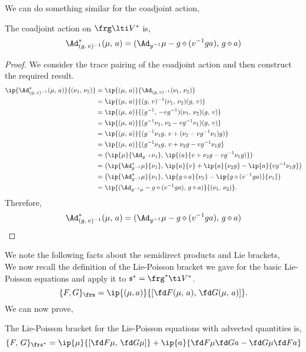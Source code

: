 \noindent
We can do something similar for the coadjoint action,
\begin{nprop}
   The coadjoint action on $\frg \lti V^*$ is,
   $$ \Ad^*_{(g,\, v)^{-1}} (\mu,\, a) = (\Ad_{g^{-1}}\mu - g \diamond (v^{-1}ga) ,\, g\diamond a) $$
\end{nprop}
\begin{proof}
  We consider the trace pairing of the coadjoint action and then construct the required result.
  \begin{align*}
    \ip{\Ad^*_{(g,\, v)^{-1}} (\mu,\, a)}{(\nu_1,\, \nu_2)} &= \ip{(\mu,\, a)}{\Ad_{(g,\,v)^{-1}} (\nu_1,\, \nu_2)} \\
    &= \ip{(\mu,\, a)}{(g,\,v)^{-1}(\nu_1,\, \nu_2)(g,\,v)} \\
    &= \ip{(\mu,\, a)}{ (g^{-1},\, -vg^{-1})(\nu_1,\, \nu_2)(g,\,v) } \\
    &= \ip{(\mu,\, a)}{(g^{-1}\nu_1,\, \nu_2 - vg^{-1}\nu_1)(g,\, v)} \\
    &= \ip{(\mu,\, a)}{(g^{-1}\nu_1 g,\,v + (\nu_2 - vg^{-1}\nu_1)g)} \\
    &= \ip{(\mu,\, a)}{(g^{-1}\nu_1 g,\,v + \nu_2g - vg^{-1}\nu_1g} \\
    &= \left(\ip{\mu}{\Ad_{g^{-1}}\nu_1},\, \ip{(a}{v + \nu_2g - vg^{-1}\nu_1g )}\right) \\
    &= \left( \ip{\Ad_{g^{-1}}^*\mu}{ \nu_1} ,\, \ip{a}{v} + \ip{a}{\nu_2g} - \ip{a}{vg^{-1}\nu_1g}\right) \\
    &= \left( \ip{\Ad_{g^{-1}}^*\mu}{ \nu_1} ,\, \ip{g \diamond a}{\nu_2} - \ip{g \diamond (v^{-1}ga)}{\nu_1}\right) \\
    &= \ip{(\Ad_{g^{-1}\mu} -g \diamond (v^{-1}ga),\, g \diamond a)}{(\nu_1,\, \nu_2)}.
  \end{align*}
  Therefore,
  $$ \Ad^*_{(g,\, v)^{-1}} (\mu,\, a) = (\Ad_{g^{-1}}\mu - g \diamond (v^{-1}ga) ,\, g\diamond a) $$
\end{proof}
\noindent
We note the following facts about the semidirect products and Lie brackets,
$$  $$
\noindent
We now recall the definition of the Lie-Poisson bracket we gave for the basic Lie-Poisson equations and apply it to $\mathfrak{s}^* = \frg^* \ti V^*$.
\begin{equation}
  \{F, G\}_{\frs} = \ip{(\mu, a)}{\left[ \fd F {(\mu,\, a)},\, \fd G {(\mu,\, a)} \right]}.\label{eq:lp_aq}
\end{equation}
We can now prove,
\begin{nlemma}
  The Lie-Poisson bracket for the Lie-Poisson equations with advected quantities is,
  $$ \{F,\, G\}_{\frs^*} = \ip{\mu}{\left[ \fd F \mu,\, \fd G \mu \right]} + \ip{a}{\fd F \mu \fd G a - \fd G \mu \fd F a} $$
\end{nlemma}
